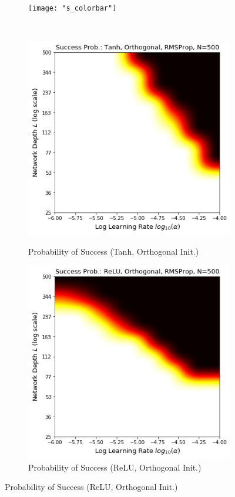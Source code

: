 \begin{figure}[h]
\begin{subfigure}{\myWidth}
  \label{fig:mnist_rmsprop_s2}
\end{subfigure}\myspace
\begin{subfigure}{8mm}
  \texttt{[image: "s\_colorbar"]}
\end{subfigure}%
\\
\begin{subfigure}{\myWidth}
  \centering
  \caption{Probability of Success (Tanh, Orthogonal Init.)}
  \includegraphics[width=1.0\linewidth,trim={0 0 0 0.65cm},clip]{"s_tanh_orthogonal_rmsprop"}
  \label{fig:mnist_rmsprop_s3}
\end{subfigure}\myspace
\begin{subfigure}{\myWidth}
  \centering
  \caption{Probability of Success (ReLU, Orthogonal Init.)}
  \includegraphics[width=1.0\linewidth,trim={0 0 0 0.65cm},clip]{"s_relu_orthogonal_rmsprop"}

\end{subfigure}
\end{figure}
